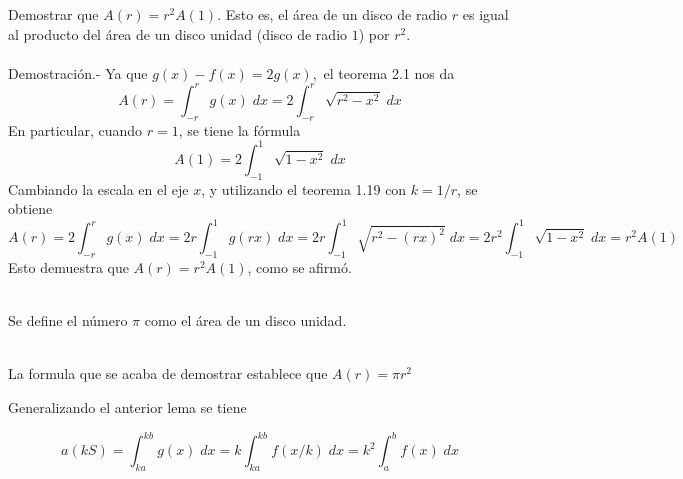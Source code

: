     \begin{lema} Demostrar que $A(r) = r^2 A(1)$. Esto es, el área de un disco de radio $r$ es igual al producto del área de un disco unidad (disco de radio $1$) por $r^2$.\\\\
	Demostración.-\; Ya que $g(x) - f(x) = 2g(x),$ el teorema 2.1 nos da 
	    $$A(r) = \int_{-r}^r g(x) \; dx = 2 \int_{-r}^r \sqrt{r^2 - x^2} \; dx$$
	    En particular, cuando $r = 1$, se tiene la fórmula $$A(1) = 2\int_{-1}^1 \sqrt{1 - x^2} \; dx$$
	    Cambiando la escala en el eje $x$, y utilizando el teorema 1.19 con $k=1/r$, se obtiene
	    $$A(r) = 2\int_{-r}^r g(x) \; dx = 2r \int_{-1}^1 g(rx) \; dx = 2r\int_{-1}^1 \sqrt{r^2 - (rx)^2} \; dx = 2r^2 \int_{-1}^1 \sqrt{1-x^2} \; dx = r^2 A(1)$$
	    Esto demuestra que $A(r) = r^2 A(1)$, como se afirmó.\\\\
    \end{lema}

\begin{tcolorbox}[colframe = white]
    \begin{def.} Se define el número $\pi$ como el área de un disco unidad.\\\\
    \end{def.}
\end{tcolorbox}
\begin{center}
    La formula que se acaba de demostrar establece que $A(r) = \pi r^2$\\
\end{center}

\begin{tcolorbox}[colframe = white]
Generalizando el anterior lema se tiene 
\begin{center}
    $$a(kS) = \int_{ka}^{kb} g(x)\; dx = k \int_{ka}^{kb} f(x/k) \; dx = k^2 \int_a^b f(x) \; dx$$
\end{center}
\end{tcolorbox}

